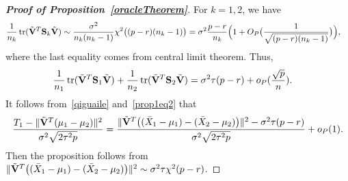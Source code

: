 \documentclass[3p]{elsarticle}
\DeclareMathOperator{\mytr}{tr}
\theoremstyle{plain}
\theoremstyle{definition}
\theoremstyle{remark}
\begin{document}
\begin{appendices}
\begin{proof}[\textbf{Proof of Proposition~\ref{oracleTheorem}}]
    For $k=1,2$, we have
    \begin{equation*}
        \begin{aligned}
            &\frac{1}{n_k} \mytr(\tilde{\BV}^T \BS_k \tilde{\BV})\sim \frac{\sigma^2}{n_k(n_k-1)}\chi^2\big((p-r)(n_k-1)\big)
            =
            \sigma^2\frac{p-r}{n_k}\Big(1+O_P\big(\frac{1}{\sqrt{(p-r)(n_k-1)}}\big)\Big),
        \end{aligned}
    \end{equation*}
    where the last equality comes from central limit theorem. 
    Thus,
    \begin{equation}\label{prop1eq2}
        \begin{aligned}
            &\frac{1}{n_1} \mytr(\tilde{\BV}^T \BS_1 \tilde{\BV})+
            \frac{1}{n_2} \mytr(\tilde{\BV}^T \BS_2 \tilde{\BV})=\sigma^2 \tau (p-r)+o_P(\frac{\sqrt{p}}{n}).
        \end{aligned}
    \end{equation}
It follows from~\eqref{qiguaile} and~\eqref{prop1eq2} that
            $$
            \frac{T_1-\|\tilde{\mathbf{V}}^T(\mu_1-\mu_2)\|^2}{\sigma^2\sqrt{2\tau^2 p}}
            =
            \frac{\|\tilde{\mathbf{V}}^T \big( (\bar{X}_1-\mu_1)-(\bar{X}_2-\mu_2) \big)\|^2-
                \sigma^2 \tau (p-r)}{\sigma^2\sqrt{2\tau^2 p}}
                +o_P(1).
    $$
Then the proposition follows from
$\|\tilde{\mathbf{V}}^T \big( (\bar{X}_1-\mu_1)-(\bar{X}_2-\mu_2) \big)\|^2\sim \sigma^2\tau\chi^2(p-r)$.
\end{proof}




\end{appendices}
\end{document}
